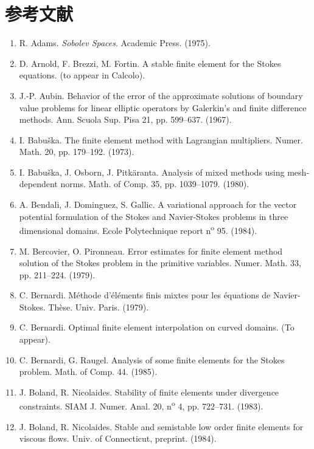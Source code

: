 \chapter*{参考文献}
\label{chap:references}
\sloppy
\begin{enumerate}
\item R. Adams. \textit{Sobolev Spaces}. Academic Press. (1975).
\item D. Arnold, F. Brezzi, M. Fortin. A stable finite element for the Stokes equations. (to appear in Calcolo).
\item J.-P. Aubin. Behavior of the error of the approximate solutions of boundary value problems for linear elliptic operators by Galerkin's and finite difference methods. Ann. Scuola Sup. Pisa 21, pp. 599--637. (1967).
\item I. Babuška. The finite element method with Lagrangian multipliers. Numer. Math. 20, pp. 179--192. (1973).
\item {}I. Babuška, J. Osborn, J. Pitkäranta. Analysis of mixed methods using mesh-dependent norms. Math. of Comp. 35, pp. 1039--1079. (1980).
\item A. Bendali, J. Dominguez, S. Gallic. A variational approach for the vector potential formulation of the Stokes and Navier-Stokes problems in three dimensional domains. Ecole Polytechnique report n\textsuperscript{o} 95. (1984).
\item M. Bercovier, O. Pironneau. Error estimates for finite element method solution of the Stokes problem in the primitive variables. Numer. Math. 33, pp. 211--224. (1979).
\item C. Bernardi. Méthode d'éléments finis mixtes pour les équations de Navier-Stokes. Thèse. Univ. Paris. (1979).
\item C. Bernardi. Optimal finite element interpolation on curved domains. (To appear).
\item C. Bernardi, G. Raugel. Analysis of some finite elements for the Stokes problem. Math. of Comp. 44. (1985).
\item J. Boland, R. Nicolaides. Stability of finite elements under divergence constraints. SIAM J. Numer. Anal. 20, n\textsuperscript{o} 4, pp. 722--731. (1983).
\item J. Boland, R. Nicolaides. Stable and semistable low order finite elements for viscous flows. Univ. of Connecticut, preprint. (1984).

\end{enumerate}
